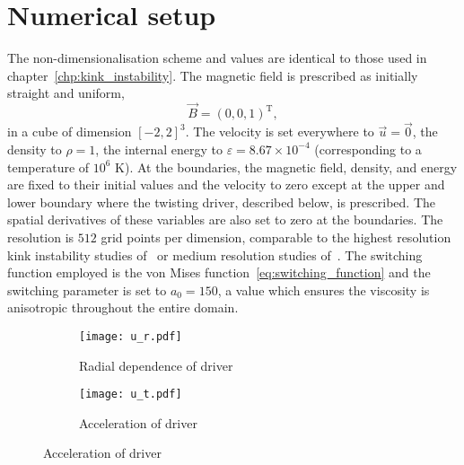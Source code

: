 \section{Numerical setup}

The non-dimensionalisation scheme and values are identical to those used in chapter~\ref{chp:kink_instability}. The magnetic field is prescribed as initially straight and uniform,
\begin{equation}
\vec{B} = (0, 0, 1)^{\text{T}},
\end{equation}
in a cube of dimension $[-2,2]^3$. The velocity is set everywhere to $\vec{u} = \vec{0}$, the density to $\rho = 1$, the internal energy to $\varepsilon = 8.67\times 10^{-4}$ (corresponding to a temperature of $10^6$ K). At the boundaries, the magnetic field, density, and energy are fixed to their initial values and the velocity to zero except at the upper and lower boundary where the twisting driver, described below, is prescribed. The spatial derivatives of these variables are also set to zero at the boundaries. The resolution is $512$ grid points per dimension, comparable to the highest resolution kink instability studies of~\cite{hoodCoronalHeatingMagnetic2009} or medium resolution studies of~\cite{barefordShockHeatingNumerical2015}. The switching function employed is the von Mises function~\eqref{eq:switching_function} and the switching parameter is set to $a_0 = 150$, a value which ensures the viscosity is anisotropic throughout the entire domain. 

\begin{figure}[t]
  \centering
  \begin{subfigure}{.49\textwidth}
  \centering
  \texttt{[image: u\_r.pdf]}
  \caption{Radial dependence of driver}
  \label{fig:kink_radial_driver}
  \end{subfigure}
  \begin{subfigure}{.49\textwidth}
  \centering
  \texttt{[image: u\_t.pdf]}
  \caption{Acceleration of driver}
  \label{fig:kink_driver_accel}
  \end{subfigure}
  
  \label{fig:kink_driver}
\end{figure}


